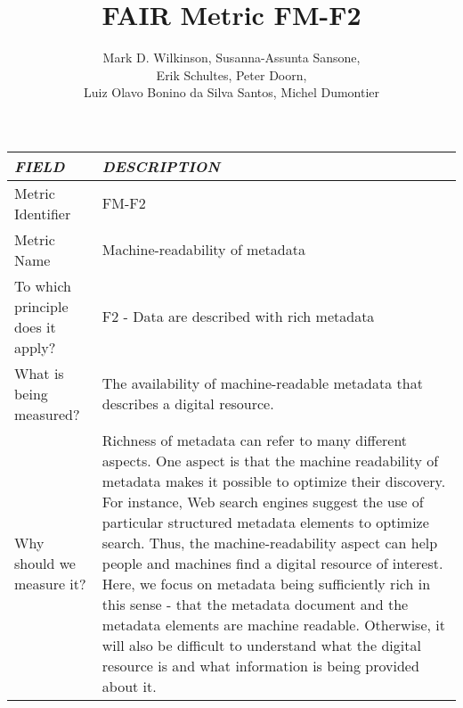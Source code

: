 \documentclass[english]{article}
\begin{document}
\title{FAIR Metric FM-F2}

\author{Mark D. Wilkinson, Susanna-Assunta Sansone, \\Erik Schultes, Peter Doorn,\\ 
Luiz Olavo Bonino da Silva Santos, Michel Dumontier}

\maketitle

\newpage





\begin{longtable}{|p{5cm}|p{9cm}|}


\hline
\emph{FIELD} & \emph{DESCRIPTION} \\
\hline
Metric Identifier &   FM-F2
 \\


\hline
Metric Name &   
Machine-readability of metadata

 \\



\hline
To which principle does it apply? &   F2 - Data are described with rich metadata\\



\hline
What is being measured? & 

The availability of machine-readable metadata that describes a digital resource.\\



\hline
Why should we measure it? & 


Richness of metadata can refer to many different aspects. One aspect is that the machine readability of metadata makes it possible to optimize their discovery. For instance, Web search engines suggest the use of particular structured metadata elements to optimize search. Thus, the machine-readability aspect can help people and machines find a digital resource of interest. Here, we focus on metadata being sufficiently rich in this sense - that the metadata document and the metadata elements are machine readable.  Otherwise, it will also be difficult to understand what the digital resource is and what information is being provided about it.

  
\\




\end{longtable}
\end{document}
